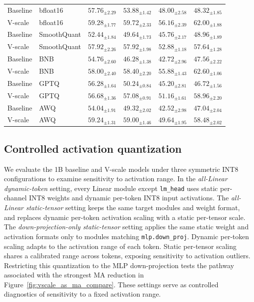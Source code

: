 \documentclass{article}
\theoremstyle{plain}
\theoremstyle{definition}
\theoremstyle{remark}
\begin{document}
\begin{table}[ht]
\begin{tabular}{llcccc}
        Baseline & bfloat16 & $57.76_{\pm 2.29}$ & $53.88_{\pm 1.42}$ & $48.00_{\pm 2.58}$ & $48.32_{\pm 1.85}$ \\
        V-scale & bfloat16 & $\mathbf{59.28}_{\pm 1.77}$ & $\mathbf{59.72}_{\pm 2.33}$ & $\mathbf{56.16}_{\pm 2.39}$ & $\mathbf{62.00}_{\pm 1.88}$ \\
        Baseline & SmoothQuant & $52.44_{\pm 1.84}$ & $49.64_{\pm 1.73}$ & $45.76_{\pm 2.17}$ & $48.96_{\pm 1.89}$ \\
        V-scale & SmoothQuant & $\mathbf{57.92}_{\pm 2.26}$ & $\mathbf{57.92}_{\pm 1.98}$ & $\mathbf{52.88}_{\pm 1.18}$ & $\mathbf{57.64}_{\pm 1.28}$ \\
        Baseline & BNB & $54.76_{\pm 2.60}$ & $46.28_{\pm 1.38}$ & $42.72_{\pm 2.96}$ & $47.56_{\pm 2.22}$ \\
        V-scale & BNB & $\mathbf{58.00}_{\pm 2.40}$ & $\mathbf{58.40}_{\pm 2.20}$ & $\mathbf{55.88}_{\pm 1.43}$ & $\mathbf{62.60}_{\pm 1.06}$ \\
        Baseline & GPTQ & $56.28_{\pm 1.64}$ & $50.24_{\pm 0.84}$ & $45.20_{\pm 2.81}$ & $46.72_{\pm 1.56}$ \\
        V-scale & GPTQ & $\mathbf{56.68}_{\pm 1.36}$ & $\mathbf{57.08}_{\pm 0.91}$ & $\mathbf{51.16}_{\pm 1.61}$ & $\mathbf{58.96}_{\pm 2.20}$ \\
        Baseline & AWQ & $54.04_{\pm 1.91}$ & $49.32_{\pm 2.02}$ & $42.52_{\pm 2.98}$ & $47.04_{\pm 2.04}$ \\
        V-scale & AWQ & $\mathbf{59.24}_{\pm 1.31}$ & $\mathbf{59.00}_{\pm 1.46}$ & $\mathbf{49.64}_{\pm 1.95}$ & $\mathbf{58.48}_{\pm 2.02}$ \\
        \bottomrule
    \end{tabular}
\end{table}

\subsection{Controlled activation quantization}\label{app:activation_quantization}

We evaluate the 1B baseline and V-scale models under three symmetric INT8 configurations to examine sensitivity to activation range. In the \emph{all-Linear dynamic-token} setting, every Linear module except \texttt{lm\_head} uses static per-channel INT8 weights and dynamic per-token INT8 input activations. The \emph{all-Linear static-tensor} setting keeps the same target modules and weight format, and replaces dynamic per-token activation scaling with a static per-tensor scale. The \emph{down-projection-only static-tensor} setting applies the same static weight and activation formats only to modules matching \texttt{mlp.down\_proj}.
Dynamic per-token scaling adapts to the activation range of each token. Static per-tensor scaling shares a calibrated range across tokens, exposing sensitivity to activation outliers. Restricting this quantization to the MLP down-projection tests the pathway associated with the strongest MA reduction in Figure~\ref{fig:vscale_as_ma_compare}. These settings serve as controlled diagnostics of sensitivity to a fixed activation range.
\end{document}
